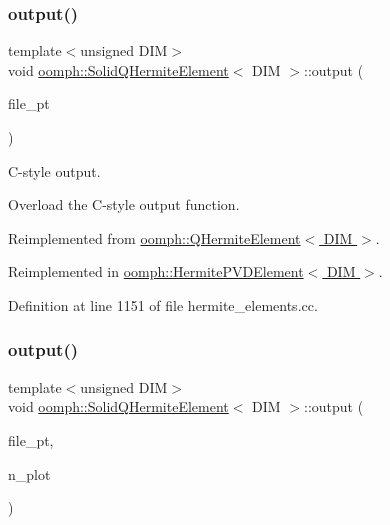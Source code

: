 \subsubsection{\texorpdfstring{output()}{output()}\hspace{0.1cm}{\footnotesize\ttfamily [3/8]}}
{\footnotesize\ttfamily template$<$unsigned D\+IM$>$ \\
void \hyperlink{classoomph_1_1SolidQHermiteElement}{oomph\+::\+Solid\+Q\+Hermite\+Element}$<$ D\+IM $>$\+::output (\begin{DoxyParamCaption}\item[{F\+I\+LE $\ast$}]{file\+\_\+pt }\end{DoxyParamCaption})\hspace{0.3cm}{\ttfamily [virtual]}}



C-\/style output. 

Overload the C-\/style output function. 

Reimplemented from \hyperlink{classoomph_1_1QHermiteElement_ae69bd9e9d2e2e90ff3116995483b87dd}{oomph\+::\+Q\+Hermite\+Element$<$ D\+I\+M $>$}.



Reimplemented in \hyperlink{classoomph_1_1HermitePVDElement_a5567656681b134890e6940972a2461d5}{oomph\+::\+Hermite\+P\+V\+D\+Element$<$ D\+I\+M $>$}.



Definition at line 1151 of file hermite\+\_\+elements.\+cc.

\mbox{\label{classoomph_1_1SolidQHermiteElement_a29b211e63df67028435a71ac732d47ad}} 
\subsubsection{\texorpdfstring{output()}{output()}\hspace{0.1cm}{\footnotesize\ttfamily [4/8]}}
{\footnotesize\ttfamily template$<$unsigned D\+IM$>$ \\
void \hyperlink{classoomph_1_1SolidQHermiteElement}{oomph\+::\+Solid\+Q\+Hermite\+Element}$<$ D\+IM $>$\+::output (\begin{DoxyParamCaption}\item[{F\+I\+LE $\ast$}]{file\+\_\+pt,  }\item[{const unsigned \&}]{n\+\_\+plot }\end{DoxyParamCaption})\hspace{0.3cm}{\ttfamily [virtual]}}



